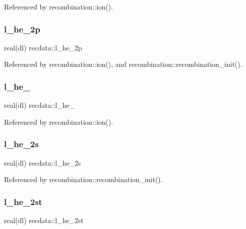 Referenced by recombination\+::ion().

\mbox{\label{namespacerecdata_a2be433bb2e316e0518793af163f2d5ce}} 
\subsubsection{\texorpdfstring{l\+\_\+he\+\_\+2p}{l\_he\_2p}}
{\footnotesize\ttfamily real(dl) recdata\+::l\+\_\+he\+\_\+2p}



Referenced by recombination\+::ion(), and recombination\+::recombination\+\_\+init().

\mbox{\label{namespacerecdata_a0961b37240c725eeb78661e93ed840d5}} 
\subsubsection{\texorpdfstring{l\+\_\+he\+\_\+2pt}{l\_he\_2pt}}
{\footnotesize\ttfamily real(dl) recdata\+::l\+\_\+he\+\_\+2pt}



Referenced by recombination\+::ion().

\mbox{\label{namespacerecdata_a92c403d880fb9d689ce3cd14be2a9419}} 
\subsubsection{\texorpdfstring{l\+\_\+he\+\_\+2s}{l\_he\_2s}}
{\footnotesize\ttfamily real(dl) recdata\+::l\+\_\+he\+\_\+2s}



Referenced by recombination\+::recombination\+\_\+init().

\mbox{\label{namespacerecdata_a3c04537ed51f41795d984b8796437d62}} 
\subsubsection{\texorpdfstring{l\+\_\+he\+\_\+2st}{l\_he\_2st}}
{\footnotesize\ttfamily real(dl) recdata\+::l\+\_\+he\+\_\+2st}



